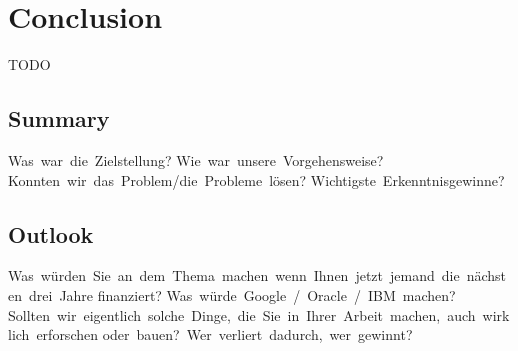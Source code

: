 \chapter{Conclusion}

TODO

\section{Summary}

Was war die Zielstellung?
Wie war unsere Vorgehensweise?
Konnten wir das Problem/die Probleme lösen?
Wichtigste Erkenntnisgewinne?

\section{Outlook}

Was würden Sie an dem Thema machen wenn Ihnen jetzt jemand die nächsten drei Jahre
finanziert?
Was würde Google / Oracle / IBM machen?
Sollten wir eigentlich solche Dinge, die Sie in Ihrer Arbeit machen, auch wirklich erforschen
oder bauen? Wer verliert dadurch, wer gewinnt?

